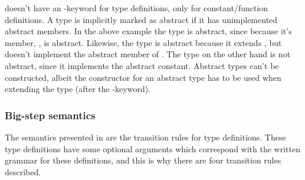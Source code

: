 
\productname{} doesn't have an -keyword for type definitions, only
for constant/function definitions. A type is implicitly marked as abstract if it has
unimplemented abstract members. In the above example the type  is abstract,
since because it's member, , is abstract. Likewise, the type
 is abstract because it extends , but doesn't implement the abstract
member of . The type  on the other hand is not abstract, since it
implements the abstract constant. Abstract types can't be constructed, albeit the
constructor for an abstract type has to be used when extending the type (after the
-keyword).

\subsubsection{Big-step semantics}

The semantics presented in  are the transition rules for type definitions.
These type definitions have some optional arguments which correspond with the
written grammar for these definitions, and this is why there are four transition
rules described.

